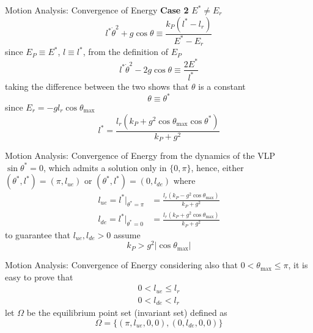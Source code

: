 \documentclass[10pt]{beamer}
\begin{document}
  \begin{frame}{Motion Analysis: Convergence of Energy}
    \noindent \textbf{Case 2} $E^* \neq E_r$
    \begin{equation*}
      l^* \dot{\theta}^2 + g\cos\theta \equiv \frac{k_P(l^*-l_r)}{E^*-E_r}
    \end{equation*}
    since $E_P \equiv E^*$, $l \equiv l^*$, from the definition of $E_P$
    \begin{equation*}
      l^* \dot{\theta}^2 - 2g\cos\theta \equiv \frac{2E^*}{l^*}
    \end{equation*}
    taking the difference between the two shows
    that $\theta$ is a constant
    \begin{equation*}
      \theta \equiv \theta^*
    \end{equation*} 
    since $E_r = -g l_r \cos\theta_{\max}$
    \begin{equation*}
      l^* = \frac{l_r(k_P+g^2\cos\theta_{\max}\cos\theta^*)}{k_P+g^2}
    \end{equation*}
  \end{frame}

  \begin{frame}{Motion Analysis: Convergence of Energy}
    from the dynamics of the VLP $\sin\theta^*=0$, which admits a solution
    only in
    $\{0, \pi\}$, hence, either $(\theta^*, l^*)=(\pi, l_{ue})$ or $(\theta^*,
    l^*)=(0, l_{de})$ where
    \begin{align*}
      l_{ue} = l^*\rvert_{\theta^*=\pi} &=
        \frac{l_r(k_P-g^2\cos\theta_{\max})}{k_P+g^2} \\
        l_{de} = l^*\rvert_{\theta^*=0} &=
        \frac{l_r(k_P+g^2\cos\theta_{\max})}{k_P+g^2}
    \end{align*}
    to guarantee that $l_{ue}, l_{de} > 0$ assume
    \begin{equation*}
      k_P > g^2 |\cos\theta_{\max}|
    \end{equation*}
  \end{frame}

  \begin{frame}{Motion Analysis: Convergence of Energy}
    considering also that $0 < \theta_{\max} \le \pi$,
    it is easy to prove that
    \begin{gather*}
        0 < l_{ue} \le l_r \\ 0 < l_{de} < l_r
    \end{gather*}
    let $\Omega$ be the equilibrium point set (invariant set) defined as
    \begin{equation*}
      \Omega = \{ (\pi, l_{ue}, 0, 0), (0, l_{de}, 0, 0) \}
    \end{equation*}
  \end{frame}
\end{document}
